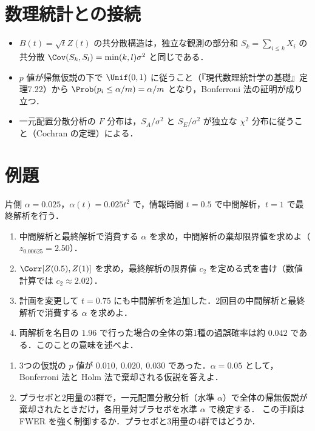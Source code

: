 \section{数理統計との接続}\label{sec:14-link}
\begin{linkbox}
\begin{itemize}
\item $B(t)=\sqrt tZ(t)$ の共分散構造は，独立な観測の部分和 $S_k=\sum_{i\le k}X_i$ の共分散 $\Cov(S_k,S_l)=\min(k,l)\sigma^2$ と同じである．
\item $p$ 値が帰無仮説の下で $\Unif(0,1)$ に従うこと（『現代数理統計学の基礎』定理7.22）から $\Prob(p_i\le\alpha/m)=\alpha/m$ となり，Bonferroni 法の証明が成り立つ．
\item 一元配置分散分析の $F$ 分布は，$S_A/\sigma^2$ と $S_E/\sigma^2$ が独立な $\chi^2$ 分布に従うこと（Cochran の定理）による．
\end{itemize}
\end{linkbox}

\section{例題}\label{sec:14-ex}
\begin{reidai}\label{reidai:14-1}
片側 $\alpha=0.025$，$\alpha(t)=0.025t^2$ で，情報時間 $t=0.5$ で中間解析，$t=1$ で最終解析を行う．
\begin{enumerate}[label=(\arabic*)]
\item 中間解析と最終解析で消費する $\alpha$ を求め，中間解析の棄却限界値を求めよ（$z_{0.00625}=2.50$）．
\item $\Corr[Z(0.5),Z(1)]$ を求め，最終解析の限界値 $c_2$ を定める式を書け（数値計算では $c_2\approx2.02$）．
\item 計画を変更して $t=0.75$ にも中間解析を追加した．2回目の中間解析と最終解析で消費する $\alpha$ を求めよ．
\item 両解析を名目の $1.96$ で行った場合の全体の第1種の過誤確率は約 $0.042$ である．このことの意味を述べよ．
\end{enumerate}
\end{reidai}

\begin{reidai}[多重性]\label{reidai:14-3}
\begin{enumerate}[label=(\arabic*)]
\item 3つの仮説の $p$ 値が $0.010,\ 0.020,\ 0.030$ であった．$\alpha=0.05$ として，Bonferroni 法と Holm 法で棄却される仮説を答えよ．
\item プラセボと2用量の3群で，一元配置分散分析（水準 $\alpha$）で全体の帰無仮説が棄却されたときだけ，各用量対プラセボを水準 $\alpha$ で検定する．
      この手順は FWER を強く制御するか．プラセボと3用量の4群ではどうか．
\end{enumerate}
\end{reidai}

